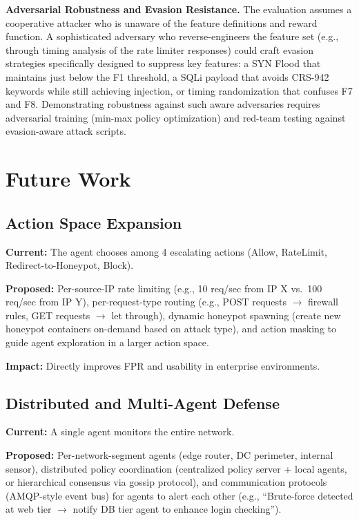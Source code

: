 \documentclass[12pt,a4paper]{report}
\begin{document}
\textbf{Adversarial Robustness and Evasion Resistance.} The evaluation assumes a cooperative attacker who is unaware of the feature definitions and reward function. A sophisticated adversary who reverse-engineers the feature set (e.g., through timing analysis of the rate limiter responses) could craft evasion strategies specifically designed to suppress key features: a SYN Flood that maintains just below the F1 threshold, a SQLi payload that avoids CRS-942 keywords while still achieving injection, or timing randomization that confuses F7 and F8. Demonstrating robustness against such aware adversaries requires adversarial training (min-max policy optimization) and red-team testing against evasion-aware attack scripts.

\section{Future Work}

\subsection{Action Space Expansion}

\textbf{Current:} The agent chooses among 4 escalating actions (Allow, RateLimit, Redirect-to-Honeypot, Block).

\textbf{Proposed:} Per-source-IP rate limiting (e.g., 10 req/sec from IP X vs.\ 100 req/sec from IP Y), per-request-type routing (e.g., POST requests $\to$ firewall rules, GET requests $\to$ let through), dynamic honeypot spawning (create new honeypot containers on-demand based on attack type), and action masking to guide agent exploration in a larger action space.

\textbf{Impact:} Directly improves FPR and usability in enterprise environments.

\subsection{Distributed and Multi-Agent Defense}

\textbf{Current:} A single agent monitors the entire network.

\textbf{Proposed:} Per-network-segment agents (edge router, DC perimeter, internal sensor), distributed policy coordination (centralized policy server + local agents, or hierarchical consensus via gossip protocol), and communication protocols (AMQP-style event bus) for agents to alert each other (e.g., ``Brute-force detected at web tier $\to$ notify DB tier agent to enhance login checking'').
\end{document}
